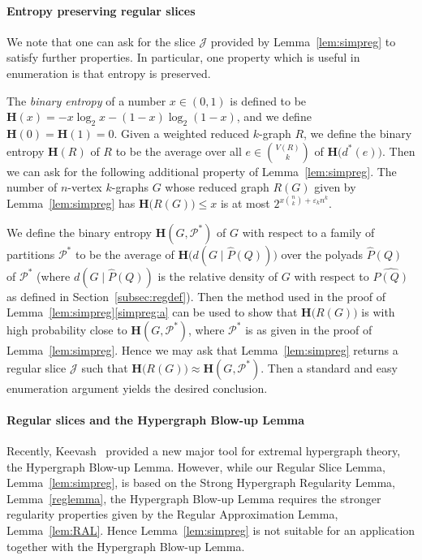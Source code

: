 \documentclass[12pt,a4paper]{amsart}
\let\eps\varepsilon
\newcommand{\cJ}{\mathcal{J}}
\newcommand{\Part}{\mathcal{P}}
\newcommand{\entropy}{\mathbf{H}}
\newcommand{\reld}{d^*}
\begin{document}
\smallskip

\paragraph{\bf Entropy preserving regular slices}

We note that one can ask for the slice $\cJ$ provided by Lemma~\ref{lem:simpreg} to satisfy further properties. In particular, one property which is useful in enumeration is that entropy is preserved.

The \emph{binary entropy} of a number $x\in(0,1)$ is defined to be
$\entropy(x)=-x\log_2 x-(1-x)\log_2 (1-x)$, and we define
$\entropy(0)=\entropy(1)=0$. Given a weighted reduced $k$-graph $R$, we
define the binary entropy $\entropy(R)$ of $R$ to be the average over all
$e\in\binom{V(R)}{k}$ of $\entropy\big(\reld(e)\big)$.  Then we can ask for
the following additional property of Lemma~\ref{lem:simpreg}. The number of
$n$-vertex $k$-graphs $G$ whose reduced graph $R(G)$ given by
Lemma~\ref{lem:simpreg} has $\entropy\big(R(G)\big)\le x$ is at most
$2^{x\binom{n}{k}+\eps_k n^k}$.

We define the binary entropy $\entropy(G,\Part^*)$ of $G$ with respect to a
family of partitions $\Part^*$ to be the average of $\entropy\big(d(G\mid
\hat{P}(Q))\big)$ over the polyads $\hat{P}(Q)$ of
$\Part^*$ (where $d(G\mid
\hat{P}(Q))$ is the relative density of $G$ with respect to $\hat{P(Q)}$ as defined in Section~\ref{subsec:regdef}).  Then the method used in the proof of
Lemma~\ref{lem:simpreg}\ref{simpreg:a} can be used to show that
$\entropy\big(R(G)\big)$ is with high probability close to
$\entropy(G,\Part^*)$, where $\Part^*$ is as given in the proof of
Lemma~\ref{lem:simpreg}. Hence we may ask that Lemma~\ref{lem:simpreg}
returns a regular slice $\cJ$ such that $\entropy\big(R(G)\big)\approx
\entropy(G,\Part^*)$. Then a standard and easy enumeration argument yields
the desired conclusion.

\smallskip

\paragraph{\bf Regular slices and the Hypergraph Blow-up Lemma}
Recently, Keevash~\cite{HypBlow} provided a new major tool for extremal
hypergraph theory, the Hypergraph Blow-up Lemma. However, while our Regular
Slice Lemma, Lemma~\ref{lem:simpreg}, is based on the Strong Hypergraph
Regularity Lemma, Lemma~\ref{reglemma}, the Hypergraph Blow-up Lemma
requires the stronger regularity properties given by the Regular
Approximation Lemma, Lemma~\ref{lem:RAL}. Hence
Lemma~\ref{lem:simpreg} is not suitable for an application together with
the Hypergraph Blow-up Lemma. 
\end{document}
